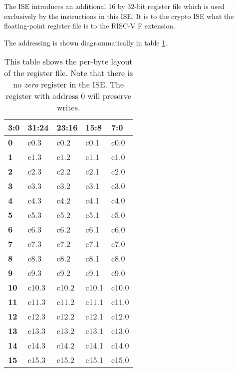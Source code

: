 
The ISE introduces an additional $16$ by $32$-bit register file which
is used exclusively by the instructions in this ISE. It is to the
crypto ISE what the floating-point register file is to the RISC-V
F extension.

The addressing is shown diagrammatically in table \ref{tab:state-addr}.

\begin{table}[h!]
\centering
\begin{tabular}{|l|l l l l|}
\hline
\multicolumn{1}{|l|}{3:0} & \textbf{31:24} & \textbf{23:16} & \textbf{15:8} & \textbf{7:0} \\ \hline
\textbf{0 }   & c0.3       & c0.2       & c0.1       & c0.0       \\ \hline
\textbf{1 }   & c1.3       & c1.2       & c1.1       & c1.0       \\ \hline
\textbf{2 }   & c2.3       & c2.2       & c2.1       & c2.0       \\ \hline
\textbf{3 }   & c3.3       & c3.2       & c3.1       & c3.0       \\ \hline
\textbf{4 }   & c4.3       & c4.2       & c4.1       & c4.0       \\ \hline
\textbf{5 }   & c5.3       & c5.2       & c5.1       & c5.0       \\ \hline
\textbf{6 }   & c6.3       & c6.2       & c6.1       & c6.0       \\ \hline
\textbf{7 }   & c7.3       & c7.2       & c7.1       & c7.0       \\ \hline
\textbf{8 }   & c8.3       & c8.2       & c8.1       & c8.0       \\ \hline
\textbf{9 }   & c9.3       & c9.2       & c9.1       & c9.0       \\ \hline
\textbf{10}   & c10.3      & c10.2      & c10.1      & c10.0      \\ \hline
\textbf{11}   & c11.3      & c11.2      & c11.1      & c11.0      \\ \hline
\textbf{12}   & c12.3      & c12.2      & c12.1      & c12.0      \\ \hline
\textbf{13}   & c13.3      & c13.2      & c13.1      & c13.0      \\ \hline
\textbf{14}   & c14.3      & c14.2      & c14.1      & c14.0      \\ \hline
\textbf{15}   & c15.3      & c15.2      & c15.1      & c15.0      \\ \hline
\end{tabular}
\caption{This table shows the per-byte layout of the register file. Note
that there is no {\em zero} register in the ISE. The register with
address $0$ will preserve writes.}
\label{tab:state-addr}
\end{table}

